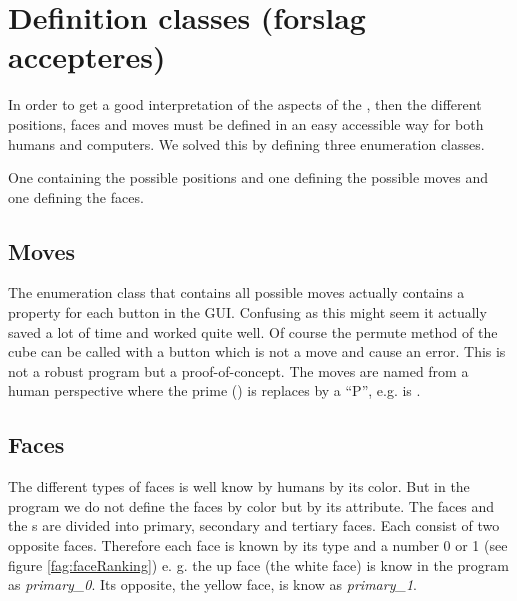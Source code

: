 \section{Definition classes (forslag accepteres)}
In order to get a good interpretation of the aspects of the \cube{}, then the different positions, faces and moves must be defined in an easy accessible way for both humans and computers. We solved this by defining three enumeration classes. 

One containing the possible positions and one defining the possible moves and one defining the faces.

\subsection{Moves}
\label{sub:moves}
The enumeration class that contains all possible moves actually contains a property for each button in the GUI. Confusing as this might seem it actually saved a lot of time and worked quite well. Of course the permute method of the cube can be called with a button which is not a move and cause an error. This is not a robust program but a proof-of-concept. 
The moves are named from a human perspective where the prime () is replaces by a ``P'', e.g.  is .

\subsection{Faces}
\label{sub:cubeFaces}
The different types of faces is well know by humans by its color.
But in the program we do not define the faces by color but by its \facelet{} attribute. 
The faces and the \facelet{}s are divided into primary, secondary and tertiary faces. 
Each consist of two opposite faces. Therefore each face is known by its type and a number 0 or 1 (see figure \ref{fag:faceRanking}) e. g. the up face (the white face) is know in the program as \textit{primary\_0}.
Its opposite, the yellow face, is know as \textit{primary\_1}. 

